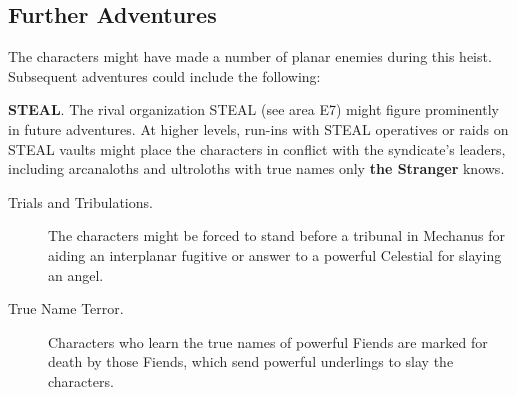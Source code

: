\documentclass[10pt,a4paper,twoside,bg=print,twocolumn,openany,nodeprecatedcode]{dndarticle}
\begin{document}
\subsection{Further Adventures}
The characters might have made a number of planar enemies during this heist. Subsequent adventures could include the following:

\textbf{STEAL}. The rival organization STEAL (see area E7) might figure prominently in future adventures. At higher levels, run-ins with STEAL operatives or raids on STEAL vaults might place the characters in conflict with the syndicate's leaders, including arcanaloths and ultroloths with true names only \textbf{the Stranger} knows.


\begin{description}
\item[Trials and Tribulations.]
The characters might be forced to stand before a tribunal in Mechanus for aiding an interplanar fugitive or answer to a powerful Celestial for slaying an angel.
\item[True Name Terror.]
Characters who learn the true names of powerful Fiends are marked for death by those Fiends, which send powerful underlings to slay the characters.
\end{description}
\end{document}

